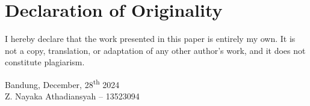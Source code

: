 \documentclass[conference]{IEEEtran}
\begin{document}

\section*{Declaration of Originality}
I hereby declare that the work presented in this paper is entirely my own. It is not a copy, translation, or adaptation of any other author's work, and it does not constitute plagiarism.

\begin{flushright}
    Bandung, December, 28\textsuperscript{th} 2024 \\  
    Z. Nayaka Athadiansyah – 13523094
\end{flushright}
\end{document}
